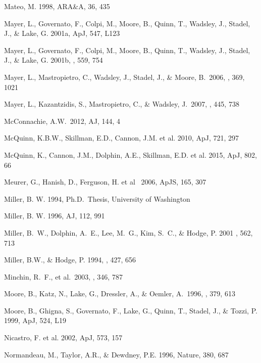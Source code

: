 \documentclass[12pt,preprint]{emulateapj}
\begin{document}
\begin{thebibliography}{}
Mateo, M. 1998, ARA\&A, 36, 435

Mayer, L., Governato, F., Colpi, M., Moore, B., Quinn, T., Wadsley, J., 
Stadel, J., \& Lake, G. 2001a, ApJ, 547, L123

Mayer, L., Governato, F., Colpi, M., Moore, B., Quinn, T., Wadsley, J., 
Stadel, J., \& Lake, G. 2001b, \apj, 559, 754 

Mayer, L., Mastropietro, C., Wadsley, J., Stadel, J., \& 
   Moore, B.\ 2006, \mnras, 369, 1021

Mayer, L., Kazantzidis, S., Mastropietro, C., \& Wadsley, J.\ 2007, \nat, 445, 738 

McConnachie, A.W.\ 2012, AJ, 144, 4 

McQuinn, K.B.W., Skillman, E.D., Cannon, J.M. et al. 2010, ApJ, 721, 297 

McQuinn, K., Cannon, J.M., Dolphin, A.E., Skillman, E.D. et al. 2015, ApJ, 802, 66 

Meurer, G., Hanish, D., Ferguson, H. et al \ 2006, ApJS, 165, 307 

Miller, B. W. 1994, Ph.D.\ Thesis, University of Washington

Miller, B. W. 1996, AJ, 112, 991 

Miller, B.~W., Dolphin, A.~E., Lee, M.~G., Kim, S.~C., \& Hodge, P. 2001
\apj , 562, 713

Miller, B.W., \& Hodge, P. 1994, \apj , 427, 656

Minchin, R.~F., et al.\ 2003, \mnras, 346, 787 

Moore, B., Katz, N., Lake, G., Dressler, A., \& Oemler, A.\ 1996, \nat, 379, 613 

Moore, B., Ghigna, S., Governato, F., Lake, G., Quinn, T., Stadel, J., \&
Tozzi, P. 1999, ApJ, 524, L19

Nicastro, F. et al. 2002, ApJ, 573, 157

Normandeau, M., Taylor, A.R., \& Dewdney, P.E. 1996, Nature, 380, 687


\end{thebibliography}
\end{document}
